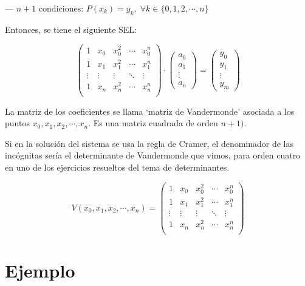 --- $n+1$ condiciones: $P(x_k)=y_k,\; \forall k \in \{0,1,2,\cdots,n\}$

Entonces, se tiene el siguiente SEL:

\begin{equation*}
	\left( \begin{matrix}
 	1&x_0&x_0^2&\cdots &x_0^n\\
 	1&x_1&x_1^2&\cdots &x_1^n\\
 	\vdots & \vdots & \vdots & \ddots & \vdots \\
 	1&x_n&x_n^2&\cdots &x_n^n\\
 \end{matrix} \right) \cdot
 \left( \begin{matrix}
 	a_0\\a_1\\ \vdots \\a_n
 \end{matrix} \right) =
 \left( \begin{matrix}
 	y_0\\y_1\\ \vdots \\y_m
 \end{matrix} \right)
\end{equation*}


La matriz de los coeficientes se llama `matriz de Vandermonde' asociada a los puntos $x_0, x_1, x_2, \cdots, x_n$. Es una matriz cuadrada de orden $n+1)$.

Si en la solución del sistema se usa la regla de Cramer, el denominador de las incógnitas sería el determinante de Vandermonde que vimos, para orden cuatro en uno de los ejercicios resueltos del tema de determinantes.

\begin{equation*}
	\boxed{\; \; 
	V(x_0, x_1, x_2, \cdots, x_n)=
	\left( \begin{matrix}
 	1&x_0&x_0^2&\cdots &x_0^n\\
 	1&x_1&x_1^2&\cdots &x_1^n\\
 	\vdots & \vdots & \vdots & \ddots & \vdots \\
 	1&x_n&x_n^2&\cdots &x_n^n\\
 \end{matrix} \right) \; \; }
\end{equation*}

\section{Ejemplo}

